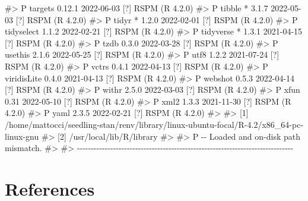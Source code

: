 \documentclass[
  11pt,
  letterpaper,
  DIV=11,
  numbers=noendperiod]{scrartcl}
\newenvironment{Shaded}{}{}
\newcommand{\CommentTok}[1]{\textcolor[rgb]{0.42,0.45,0.49}{#1}}
\begin{document}
\begin{Shaded}
\begin{Highlighting}[]
\CommentTok{\#\textgreater{}  P targets       0.12.1  2022{-}06{-}03 [?] RSPM (R 4.2.0)}
\CommentTok{\#\textgreater{}  P tibble      * 3.1.7   2022{-}05{-}03 [?] RSPM (R 4.2.0)}
\CommentTok{\#\textgreater{}  P tidyr       * 1.2.0   2022{-}02{-}01 [?] RSPM (R 4.2.0)}
\CommentTok{\#\textgreater{}  P tidyselect    1.1.2   2022{-}02{-}21 [?] RSPM (R 4.2.0)}
\CommentTok{\#\textgreater{}  P tidyverse   * 1.3.1   2021{-}04{-}15 [?] RSPM (R 4.2.0)}
\CommentTok{\#\textgreater{}  P tzdb          0.3.0   2022{-}03{-}28 [?] RSPM (R 4.2.0)}
\CommentTok{\#\textgreater{}  P usethis       2.1.6   2022{-}05{-}25 [?] RSPM (R 4.2.0)}
\CommentTok{\#\textgreater{}  P utf8          1.2.2   2021{-}07{-}24 [?] RSPM (R 4.2.0)}
\CommentTok{\#\textgreater{}  P vctrs         0.4.1   2022{-}04{-}13 [?] RSPM (R 4.2.0)}
\CommentTok{\#\textgreater{}  P viridisLite   0.4.0   2021{-}04{-}13 [?] RSPM (R 4.2.0)}
\CommentTok{\#\textgreater{}  P webshot       0.5.3   2022{-}04{-}14 [?] RSPM (R 4.2.0)}
\CommentTok{\#\textgreater{}  P withr         2.5.0   2022{-}03{-}03 [?] RSPM (R 4.2.0)}
\CommentTok{\#\textgreater{}  P xfun          0.31    2022{-}05{-}10 [?] RSPM (R 4.2.0)}
\CommentTok{\#\textgreater{}  P xml2          1.3.3   2021{-}11{-}30 [?] RSPM (R 4.2.0)}
\CommentTok{\#\textgreater{}  P yaml          2.3.5   2022{-}02{-}21 [?] RSPM (R 4.2.0)}
\CommentTok{\#\textgreater{} }
\CommentTok{\#\textgreater{}  [1] /home/mattocci/seedling{-}stan/renv/library/linux{-}ubuntu{-}focal/R{-}4.2/x86\_64{-}pc{-}linux{-}gnu}
\CommentTok{\#\textgreater{}  [2] /usr/local/lib/R/library}
\CommentTok{\#\textgreater{} }
\CommentTok{\#\textgreater{}  P {-}{-} Loaded and on{-}disk path mismatch.}
\CommentTok{\#\textgreater{} }
\CommentTok{\#\textgreater{} {-}{-}{-}{-}{-}{-}{-}{-}{-}{-}{-}{-}{-}{-}{-}{-}{-}{-}{-}{-}{-}{-}{-}{-}{-}{-}{-}{-}{-}{-}{-}{-}{-}{-}{-}{-}{-}{-}{-}{-}{-}{-}{-}{-}{-}{-}{-}{-}{-}{-}{-}{-}{-}{-}{-}{-}{-}{-}{-}{-}{-}{-}{-}{-}{-}{-}{-}{-}{-}{-}{-}{-}{-}{-}{-}{-}{-}{-}}
\end{Highlighting}
\end{Shaded}

\hypertarget{references}{%
\section*{References}\label{references}}
\end{document}
